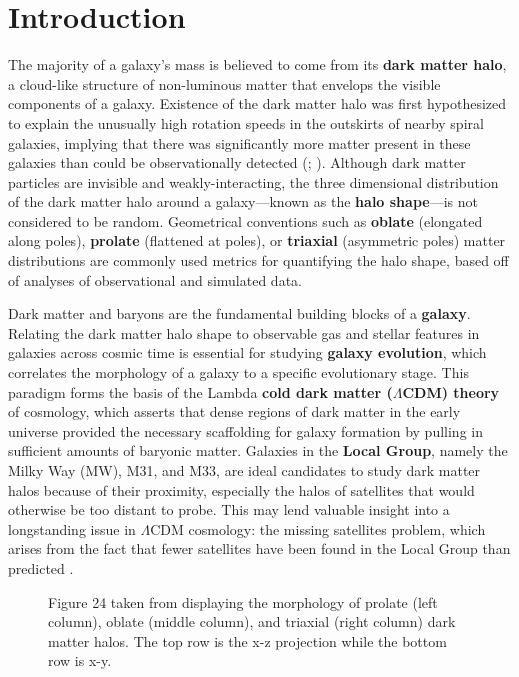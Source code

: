 \documentclass[twocolumn, linenumbers,trackchanges]{aastex7}
\begin{document}
\section{Introduction} 
The majority of a galaxy's mass is believed to come from its \textbf{dark matter halo}, a cloud-like structure of non-luminous matter that envelops the visible components of a galaxy. Existence of the dark matter halo was first hypothesized to explain the unusually high rotation speeds in the outskirts of nearby spiral galaxies, implying that there was significantly more matter present in these galaxies than could be observationally detected (\citealp{Zwicky_1933}; \citealp{Rubin_1970}). Although dark matter particles are invisible and weakly-interacting, the three dimensional distribution of the dark matter halo around a galaxy—known as the \textbf{halo shape}—is not considered to be random. Geometrical conventions such as \textbf{oblate} (elongated along poles), \textbf{prolate} (flattened at poles), or \textbf{triaxial} (asymmetric poles) matter distributions are commonly used metrics for quantifying the halo shape, based off of analyses of observational and simulated data. 

Dark matter and baryons are the fundamental building blocks of a \textbf{galaxy}. Relating the dark matter halo shape to observable gas and stellar features in galaxies across cosmic time is essential for studying \textbf{galaxy evolution}, which correlates the morphology of a galaxy to a specific evolutionary stage. This paradigm forms the basis of the Lambda \textbf{cold dark matter ($\Lambda$CDM) theory} of cosmology, which asserts that dense regions of dark matter in the early universe provided the necessary scaffolding for galaxy formation by pulling in sufficient amounts of baryonic matter. Galaxies in the \textbf{Local Group}, namely the Milky Way (MW), M31, and M33, are ideal candidates to study dark matter halos because of their proximity, especially the halos of satellites that would otherwise be too distant to probe. This may lend valuable insight into a longstanding issue in $\Lambda$CDM cosmology: the missing satellites problem, which arises from the fact that fewer satellites have been found in the Local Group than predicted \citep{Kauffmann_1993}. 

\begin{figure}[ht!]
\caption{Figure 24 taken from \cite{Garavito-Camargo_2021} displaying the morphology of prolate (left column), oblate (middle column), and triaxial (right column) dark matter halos. The top row is the x-z projection while the bottom row is x-y.}
\label{fig:shapes}
\end{figure}
\end{document}
